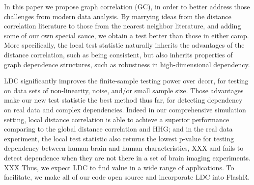 \documentclass[11pt]{article}
\begin{document}


In this paper we propose graph correlation (GC), in order to better address those challenges from modern data analysis. By marrying ideas from the distance correlation literature to those from the nearest neighbor literature, and adding some of our own special sauce, we obtain a test better than those in either camp.  More specifically,  the local test statistic naturally inherits the advantages of the  distance correlation, such as being consistent, but also inherits properties of graph dependence structures, such as robustness in high-dimensional dependency.  

LDC significantly improves the finite-sample testing power over dcorr, for testing on data sets of non-linearity, noise, and/or small sample size. Those advantages make our new test statistic the best method thus far, for detecting dependency on real data and complex dependencies. Indeed in our comprehensive simulation setting, local distance correlation is able to achieve a superior performance comparing to the global distance correlation and HHG; and in the real data experiment, the local test statistic also returns the lowest p-value for testing dependency between human brain and human characteristics, XXX and fails to detect dependence when they are not there in a set of brain imaging experiments. XXX  Thus, we expect LDC to find value in a wide range of applications.  To facilitate, we make all of our code open source and incorporate LDC into FlashR.


\end{document}

